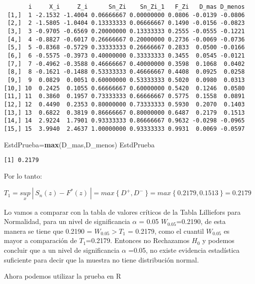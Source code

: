 \documentclass[
  a4paper,
  oneside,
  openany]{book}
\newenvironment{Shaded}{\begin{snugshade}}{\end{snugshade}}
\newcommand{\KeywordTok}[1]{\textcolor[rgb]{0.13,0.29,0.53}{\textbf{#1}}}
\newcommand{\NormalTok}[1]{#1}
\begin{document}
\begin{verbatim}
       i     X_i     Z_i      Sn_Zi    Sn_Zi_1   F_Zi   D_mas D_menos
 [1,]  1 -2.1532 -1.4004 0.06666667 0.00000000 0.0806 -0.0139 -0.0806
 [2,]  2 -1.5805 -1.0404 0.13333333 0.06666667 0.1490 -0.0156 -0.0823
 [3,]  3 -0.9705 -0.6569 0.20000000 0.13333333 0.2555 -0.0555 -0.1221
 [4,]  4 -0.8827 -0.6017 0.26666667 0.20000000 0.2736 -0.0069 -0.0736
 [5,]  5 -0.8368 -0.5729 0.33333333 0.26666667 0.2833  0.0500 -0.0166
 [6,]  6 -0.5575 -0.3973 0.40000000 0.33333333 0.3455  0.0545 -0.0121
 [7,]  7 -0.4962 -0.3588 0.46666667 0.40000000 0.3598  0.1068  0.0402
 [8,]  8 -0.1621 -0.1488 0.53333333 0.46666667 0.4408  0.0925  0.0258
 [9,]  9  0.0829  0.0051 0.60000000 0.53333333 0.5020  0.0980  0.0313
[10,] 10  0.2425  0.1055 0.66666667 0.60000000 0.5420  0.1246  0.0580
[11,] 11  0.3860  0.1957 0.73333333 0.66666667 0.5775  0.1558  0.0891
[12,] 12  0.4490  0.2353 0.80000000 0.73333333 0.5930  0.2070  0.1403
[13,] 13  0.6822  0.3819 0.86666667 0.80000000 0.6487  0.2179  0.1513
[14,] 14  2.9224  1.7901 0.93333333 0.86666667 0.9632 -0.0298 -0.0965
[15,] 15  3.9940  2.4637 1.00000000 0.93333333 0.9931  0.0069 -0.0597
\end{verbatim}

\begin{Shaded}
\begin{Highlighting}[]
\NormalTok{EstdPrueba=}\KeywordTok{max}\NormalTok{(D\_mas,D\_menos)}
\NormalTok{EstdPrueba}
\end{Highlighting}
\end{Shaded}

\begin{verbatim}
[1] 0.2179
\end{verbatim}

Por lo tanto:

\[T_{1}=\underset{x}{sup} \ | \ S_{n}(z)-F^*(z)\ |=max \ \{\ D^+,D^- \ \}=max \ \{ \  0.2179,0.1513 \ \}=0.2179 \]

Lo vamos a comparar con la tabla de valores críticos de la Tabla Lilliefors para Normalidad, para un nivel de significancia \(\alpha\) = 0.05 \(W_{0.05}\)=0.2190, de esta manera se tiene que 0.2190 = \(W_{0.05} > T_{1}\) = 0.2179, como el cuantil \(W_{0.05}\) es mayor a comparación de \(T_{1}\)=0.2179.
Entonces no Rechazamos \(H_0\) y podemos concluir que a un nivel de significancia \(\alpha\) =0.05, no existe evidencia estadística suficiente para decir que la muestra no tiene distribución normal.

Ahora podemos utilizar la prueba en R
\end{document}
